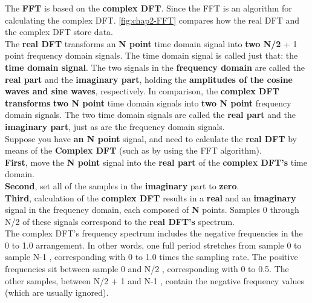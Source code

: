 \begin{compactitem}
The \textbf{FFT} is based on the \textbf{complex DFT}.
Since the FFT is an algorithm for calculating the complex DFT. \autoref{fig:chap2-FFT}
compares how the real DFT and the complex DFT store data.\\

The \textbf{real DFT} transforms an \textbf{N point} time domain signal into
\textbf{two N/2} + 1 point frequency domain signals. The time domain
signal is called just that: the \textbf{time domain signal}. The two signals in the
\textbf{frequency domain} are called the \textbf{real part} and the \textbf{imaginary part},
holding the \textbf{amplitudes of the cosine waves and sine waves}, respectively.
In comparison, the \textbf{complex DFT transforms} \textbf{two N point} time domain signals
into \textbf{two N point} frequency domain signals. The two time domain signals are
called the \textbf{real part} and the \textbf{imaginary part}, just as are the frequency domain
signals.
\\Suppose you have \textbf{an N point} signal, and need to calculate the \textbf{real DFT} by
means of the \textbf{Complex DFT} (such as by using the FFT algorithm).\\
\textbf{First}, move the \textbf{N point} signal into the \textbf{real part} of the \textbf{complex DFT's} time domain.\\
\textbf{Second}, set all of the samples in the \textbf{imaginary} part to \textbf{zero}.\\
\textbf{Third}, calculation of the \textbf{complex DFT} results in a \textbf{real} and an \textbf{imaginary}
signal in the frequency domain, each composed of \textbf{N} points.
Samples 0 through N/2 of these signals correspond to the \textbf{real DFT's} spectrum.\\
The complex DFT's frequency spectrum includes the negative frequencies in the 0
to 1.0 arrangement. In other words, one full period stretches from sample 0 to
sample N-1 , corresponding with 0 to 1.0 times the sampling rate. The positive
frequencies sit between sample 0 and N/2 , corresponding with 0 to 0.5. The
other samples, between N/2 + 1 and N-1 , contain the negative frequency
values (which are usually ignored). \cite{smith1997dspbook}


\end{compactitem}


